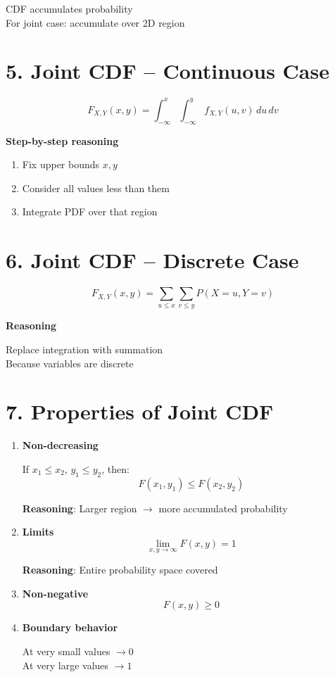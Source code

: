 \documentclass[12pt]{article}
\begin{document}
CDF accumulates probability \\
For joint case: accumulate over 2D region

\section*{5. Joint CDF -- Continuous Case}

\[
F_{X,Y}(x,y) = \int_{-\infty}^{x} \int_{-\infty}^{y} f_{X,Y}(u,v)\,du\,dv
\]

\textbf{Step-by-step reasoning}

\begin{enumerate}
\item Fix upper bounds $x, y$
\item Consider all values less than them
\item Integrate PDF over that region
\end{enumerate}

\section*{6. Joint CDF -- Discrete Case}

\[
F_{X,Y}(x,y) = \sum_{u \le x} \sum_{v \le y} P(X=u, Y=v)
\]

\textbf{Reasoning}

Replace integration with summation \\
Because variables are discrete

\section*{7. Properties of Joint CDF}

\begin{enumerate}
\item \textbf{Non-decreasing}

If $x_1 \le x_2$, $y_1 \le y_2$, then:
\[
F(x_1, y_1) \le F(x_2, y_2)
\]

\textbf{Reasoning}: Larger region $\rightarrow$ more accumulated probability

\item \textbf{Limits}
\[
\lim_{x,y \to \infty} F(x,y) = 1
\]

\textbf{Reasoning}: Entire probability space covered

\item \textbf{Non-negative}
\[
F(x,y) \ge 0
\]

\item \textbf{Boundary behavior}

At very small values $\rightarrow 0$ \\
At very large values $\rightarrow 1$
\end{enumerate}
\end{document}
